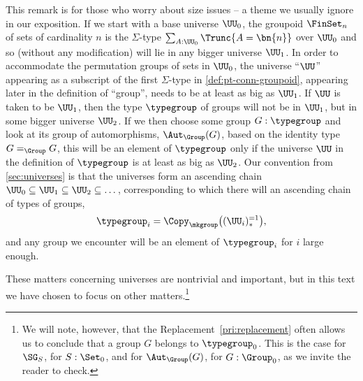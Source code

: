 \begin{remark}
  \label{rem:groupsarebig}
  This remark is for those who worry about size issues -- a theme we usually ignore in our exposition.  If we
  start with a base universe $\UU_0$, the groupoid $\FinSet_n$ of sets of cardinality $n$ is the $\Sigma$-type
  $\sum_{A:\UU_0}\Trunc{A=\bn{n}}$ over $\UU_0$ and so (without any modification) will lie in any bigger
  universe $\UU_1$.  In order to accommodate the permutation groups of sets in $\UU_0$, the universe ``$\UU$'' appearing as
  a subscript of the first $\Sigma$-type in \cref{def:pt-conn-groupoid}, appearing later in the definition of
  ``group'', needs to be at least as big as $\UU_1$.  If $\UU$ is taken to be $\UU_1$, then the type
  $\typegroup$ of groups will not be in $\UU_1$, but in some bigger universe $\UU_2$.  If we then choose some
  group $G:\typegroup$ and look at its group of automorphisms, $\Aut_\Group(G)$, based on the identity type $G =_\Group G$, this will be an element of $\typegroup$ only if the universe $\UU$ in the definition of
  $\typegroup$ is at least as big as $\UU_2$.  Our convention from \cref{sec:universes} is
  that the universes form an ascending chain $\UU_0\subseteq\UU_1\subseteq\UU_2\subseteq\dots$, corresponding
  to which there will an ascending chain of types of groups,
  \[
    \typegroup_i = \Copy_{\mkgroup}\bigl( (\UU_i)_*^{=1} \bigr),
  \]
  and any group we encounter will be an element of $\typegroup_i$ for $i$
  large enough.

  These matters concerning universes are nontrivial and important,
  but in this text we have chosen to focus on other matters.\footnote{%
    We will note, however, that the Replacement~\cref{pri:replacement}
    often allows us to conclude that a group $G$ belongs to $\typegroup_0$.
    This is the case for $\SG_S$, for $S:\Set_0$, and for $\Aut_\Group(G)$,
    for $G:\Group_0$, as we invite the reader to check.}
\end{remark}

